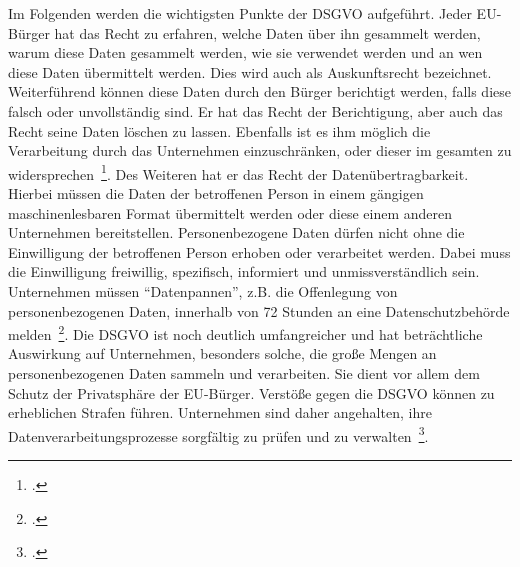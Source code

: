 Im Folgenden werden die wichtigsten Punkte der \ac{DSGVO} aufgeführt. Jeder \ac{EU}-Bürger hat das Recht zu erfahren, welche Daten über ihn gesammelt werden, warum diese Daten gesammelt werden, wie sie verwendet werden und an wen diese Daten übermittelt werden. 
Dies wird auch als Auskunftsrecht bezeichnet. Weiterführend können diese Daten durch den Bürger
berichtigt werden, falls diese falsch oder unvollständig sind. Er hat das Recht der Berichtigung, aber auch das Recht seine Daten löschen zu lassen. Ebenfalls ist es ihm möglich die 
Verarbeitung durch das Unternehmen einzuschränken, oder dieser im gesamten zu widersprechen~\footcite[\vglf][]{Voigt.2018}. Des Weiteren hat er das Recht der Datenübertragbarkeit. Hierbei müssen die Daten der
betroffenen Person in einem gängigen maschinenlesbaren Format übermittelt werden oder diese einem anderen Unternehmen bereitstellen.
Personenbezogene Daten dürfen nicht ohne die Einwilligung der betroffenen Person erhoben oder verarbeitet werden. Dabei muss die Einwilligung freiwillig, spezifisch, informiert und
unmissverständlich sein.
Unternehmen müssen \enquote{Datenpannen}, z.B. die Offenlegung von personenbezogenen Daten, innerhalb von 72 Stunden an eine Datenschutzbehörde melden~\footcite[\vglf][]{Voigt.2018}.
Die \ac{DSGVO} ist noch deutlich umfangreicher und hat beträchtliche Auswirkung auf Unternehmen, besonders solche, die große Mengen an personenbezogenen Daten sammeln und verarbeiten.
Sie dient vor allem dem Schutz der Privatsphäre der \ac{EU}-Bürger.
Verstöße gegen die DSGVO können zu erheblichen Strafen führen. Unternehmen sind daher angehalten, ihre Datenverarbeitungsprozesse sorgfältig zu prüfen und zu verwalten~\footcite[\vglf][]{Voigt.2018}.
